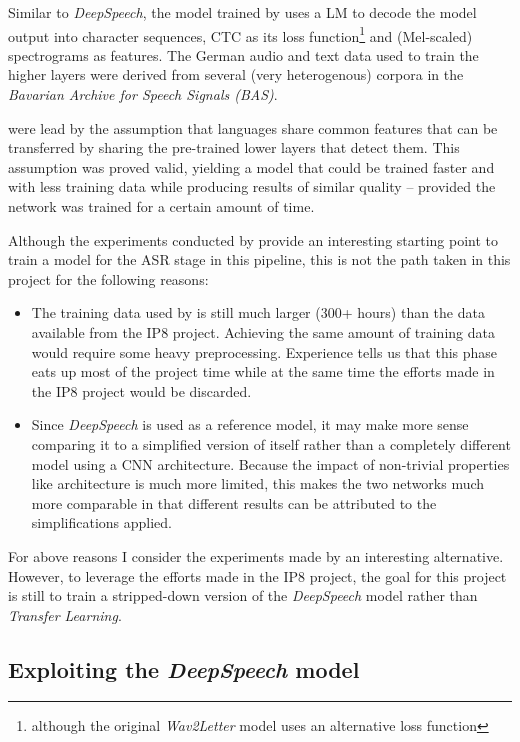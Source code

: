 Similar to \textit{DeepSpeech}, the model trained by \cite{budget} uses a \ac{LM} to decode the model output into character sequences, \ac{CTC} as its loss function\footnote{although the original \textit{Wav2Letter} model uses an alternative loss function} and (Mel-scaled) spectrograms as features. The German audio and text data used to train the higher layers were derived from several (very heterogenous) corpora in the \textit{Bavarian Archive for Speech Signals (BAS)}. 

\cite{budget} were lead by the assumption that languages share common features that can be transferred by sharing the pre-trained lower layers that detect them. This assumption was proved valid, yielding a model that could be trained faster and with less training data while producing results of similar quality -- provided the network was trained for a certain amount of time.

Although the experiments conducted by \cite{budget} provide an interesting starting point to train a model for the \ac{ASR} stage in this pipeline, this is not the path taken in this project for the following reasons:

\begin{itemize}
	\item The training data used by \cite{budget} is still much larger (300+ hours) than the data available from the IP8 project. Achieving the same amount of training data would require some heavy preprocessing. Experience tells us that this phase eats up most of the project time while at the same time the efforts made in the IP8 project would be discarded.
	\item Since \textit{DeepSpeech} is used as a reference model, it may make more sense comparing it to a simplified version of itself rather than a completely different model using a \ac{CNN} architecture. Because the impact of non-trivial properties like architecture is much more limited, this makes the two networks much more comparable in that different results can be attributed to the simplifications applied.
\end{itemize}

For above reasons I consider the experiments made by \cite{budget} an interesting alternative. However, to leverage the efforts made in the IP8 project, the goal for this project is still to train a stripped-down version of the \textit{DeepSpeech} model rather than \textit{Transfer Learning}.

\subsection{Exploiting the \textit{DeepSpeech} model}

